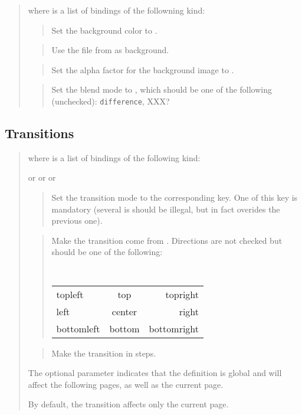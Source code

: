\documentclass{article}
\begin{document}
\medskip\noindent
\docdef \advisetbg{}
\begin{quote}
where  is a list of bindings of the followning kind:

\begin{quote}
Set the background color to .
\end{quote}

\begin{quote}
Use the file from  as background.
\end{quote}

\begin{quote}
Set the alpha factor for the background image to .
\end{quote}

\begin{quote}
Set the blend mode to , which should be one of the
following (unchecked): {\tt difference}, XXX?
\end{quote}



\end{quote}

\subsection {Transitions}

\docdef \advitrans {}
\begin{quote}
where  is a list of bindings of the following kind:

 or  or  or 
\begin{quote}
Set the transition mode to the corresponding key.
One of this key is mandatory (several is should be illegal, but in fact
overides the previous one). 
\end{quote}

\begin{quote}
Make the transition come from .  Directions are not checked
but should be one of the following: 
\begin{center}
\tt
\begin{tabular}{l@{\qquad}c@{\qquad}r}
topleft&   top& topright\\
left&  center&  right \\
bottomleft& bottom & bottomright\\
\end{tabular}
\end{center}
\end{quote}

\begin{quote}
Make the transition in  steps. 
\end{quote}
The optional parameter  indicates that
the definition is global and will affect the following pages, 
as well as the current page. 

By default, the transition affects only the current page. 
\end{quote}
\end{document}
